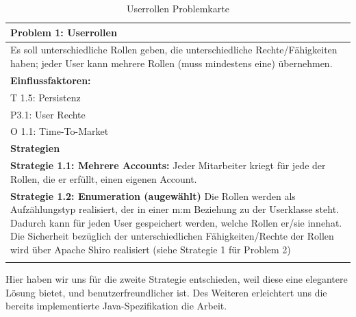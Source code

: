 \documentclass[enabledeprecatedfontcommands,fontsize=12pt,paper=a4,twoside]{scrartcl}
\begin{document}
\begin{table}[H]
    \centering
    \begin{tabular}{|p{15cm}|}
    \hline
          \textbf{Problem 1:} Userrollen \\ \hline
          Es soll unterschiedliche Rollen geben, die unterschiedliche Rechte/Fähigkeiten haben; jeder User kann mehrere Rollen (muss mindestens eine) übernehmen. \\ \hline
          \textbf{Einflussfaktoren: } \\
          T 1.5: Persistenz \\
          P3.1: User Rechte\\
          O 1.1: Time-To-Market \\
          \hline
          \textbf{Strategien} \\ \hline
            {}          
           \label{strategie:1.1}     
          \textbf{Strategie 1.1: Mehrere Accounts:} Jeder Mitarbeiter kriegt für jede der Rollen, die er erfüllt, einen eigenen Account. \\        
  {}          
           \label{strategie:1.2}              
          \textbf{Strategie 1.2: Enumeration (augewählt)} Die Rollen werden als Aufzählungstyp realisiert, der in einer m:m Beziehung zu der Userklasse steht. Dadurch kann für jeden User gespeichert werden, welche Rollen er/sie innehat. Die Sicherheit bezüglich der unterschiedlichen Fähigkeiten/Rechte der Rollen wird über Apache Shiro realisiert (siehe Strategie 1 für Problem 2)\\
	 \\ \hline
    \end{tabular}

    \caption{Userrollen Problemkarte}
    \label{tab:ProblemKarte1}
\end{table}
Hier haben wir uns für die zweite Strategie entschieden, weil diese eine elegantere Lösung bietet, und benutzerfreundlicher ist. Des Weiteren erleichtert uns die bereits implementierte Java-Spezifikation die Arbeit. \\
\end{document}
